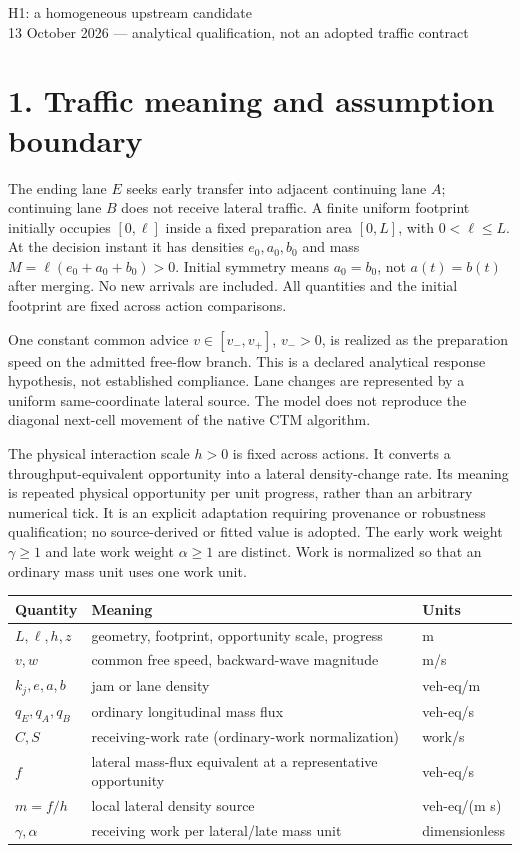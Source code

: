 \documentclass[11pt,a4paper]{article}
\begin{document}
\begin{center}
{\Large H1: a homogeneous upstream candidate}\\[4pt]
13 October 2026 --- analytical qualification, not an adopted traffic contract
\end{center}

\section*{1. Traffic meaning and assumption boundary}
The ending lane $E$ seeks early transfer into adjacent continuing lane $A$;
continuing lane $B$ does not receive lateral traffic. A finite uniform
footprint initially occupies $[0,\ell]$ inside a fixed preparation area
$[0,L]$, with $0<\ell\leq L$. At the decision instant it has densities
$e_0,a_0,b_0$ and mass $M=\ell(e_0+a_0+b_0)>0$. Initial symmetry means
$a_0=b_0$, not $a(t)=b(t)$ after merging. No new arrivals are included.
All quantities and the initial footprint are fixed across action comparisons.

One constant common advice $v\in[v_-,v_+]$, $v_->0$, is realized as the
preparation speed on the admitted free-flow branch. This is a declared
analytical response hypothesis, not established compliance. Lane changes
are represented by a uniform same-coordinate lateral source. The model does
not reproduce the diagonal next-cell movement of the native CTM algorithm.

The physical interaction scale $h>0$ is fixed across actions. It converts a
throughput-equivalent opportunity into a lateral density-change rate. Its
meaning is repeated physical opportunity per unit progress, rather than an
arbitrary numerical tick. It is an explicit adaptation requiring provenance
or robustness qualification; no source-derived or fitted value is adopted.
The early work weight $\gamma\geq1$ and late work weight $\alpha\geq1$ are
distinct. Work is normalized so that an ordinary mass unit uses one work unit.

\begin{center}
\begin{tabular}{lll}
\toprule
Quantity & Meaning & Units\\
\midrule
$L,\ell,h,z$ & geometry, footprint, opportunity scale, progress & m\\
$v,w$ & common free speed, backward-wave magnitude & m/s\\
$k_j,e,a,b$ & jam or lane density & veh-eq/m\\
$q_E,q_A,q_B$ & ordinary longitudinal mass flux & veh-eq/s\\
$C,S$ & receiving-work rate (ordinary-work normalization) & work/s\\
$f$ & lateral mass-flux equivalent at a representative opportunity & veh-eq/s\\
$m=f/h$ & local lateral density source & veh-eq/(m s)\\
$\gamma,\alpha$ & receiving work per lateral/late mass unit & dimensionless\\
\bottomrule
\end{tabular}
\end{center}
\end{document}
